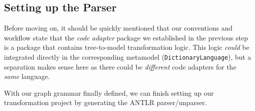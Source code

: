 \newpage
\hypertarget{subSec:setupParser}{}
\subsection{Setting up the Parser}
\genHeader

Before moving on, it should be quickly mentioned that our conventions and workflow state that the \emph{code adapter} package we established in the
previous step is a package that contains tree-to-model transformation logic. This logic \emph{could} be integrated directly in the corresponding metamodel
(\texttt{Dic\-tion\-ary\-Language}), but a separation makes sense here as there could be \emph{different} code adapters for the \emph{same} language.

With our graph grammar finally defined, we can finish setting up our transformation project by generating the ANTLR parser/unparser.

